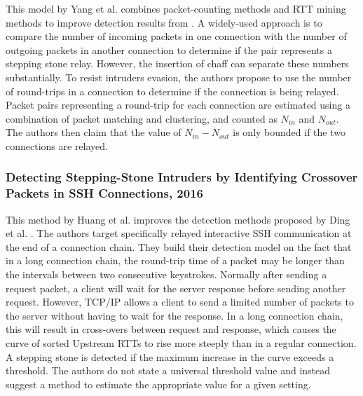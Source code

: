 \documentclass[runningheads]{llncs}\usepackage[]{graphicx}\usepackage[]{color}
\begin{document}
This model by Yang et al. \cite{yang2015rtt} combines packet-counting methods and RTT mining methods to improve detection results from \cite{yang2007mining}. 
A widely-used approach is to compare the number of incoming packets in one connection with the number of outgoing packets in another connection  to determine if the pair represents a stepping stone relay. However, the insertion of chaff can separate these numbers substantially.
To resist intruders  evasion,  the authors  propose  to use the  number of  round-trips in  a  connection  to  determine  if  the  connection  is being  relayed.
Packet pairs representing a round-trip for each connection are estimated using a combination of packet matching and clustering, and counted as $N_{in}$ and $N_{out}$. The authors then claim that the value of $N_{in}-N_{out}$ is only bounded if the two connections are relayed.

\subsubsection{Detecting Stepping-Stone Intruders by Identifying Crossover Packets in SSH Connections, 2016}

This method by Huang et al. \cite{huang2016detecting} improves the detection methods proposed by Ding et al. \cite{ding2009detecting}. The authors target specifically relayed interactive SSH communication at the end of a connection chain. They build their detection model on the fact that in a long connection chain, the round-trip time of a packet may be longer than the intervals between two consecutive keystrokes. Normally after sending a request packet, a client will wait for the server response before sending another request. However, TCP/IP allows a client to send a limited number of packets to the server without having to wait for the response. In a long connection chain, this will result in cross-overs between request and response, which causes the curve of sorted Upstream RTTs to rise more steeply than in a regular connection. A stepping stone is detected if the maximum increase in the curve exceeds a threshold. The authors do not state a universal threshold value and instead suggest a method to estimate the appropriate value for a given setting.



\end{document}

